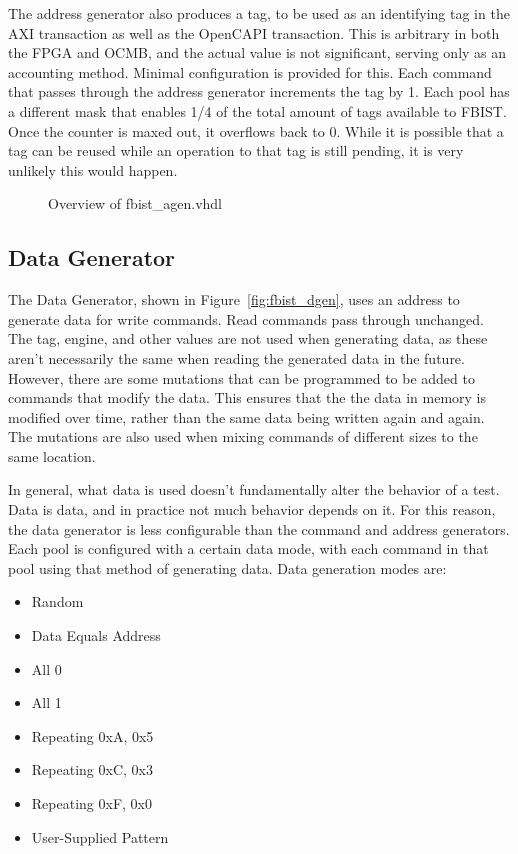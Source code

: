 The address generator also produces a tag, to be used as an
identifying tag in the AXI transaction as well as the OpenCAPI
transaction. This is arbitrary in both the FPGA and OCMB, and the
actual value is not significant, serving only as an accounting
method. Minimal configuration is provided for this. Each command that
passes through the address generator increments the tag by 1. Each
pool has a different mask that enables 1/4 of the total amount of tags
available to FBIST. Once the counter is maxed out, it overflows back
to 0. While it is possible that a tag can be reused while an operation
to that tag is still pending, it is very unlikely this would happen.

\begin{figure}[h]
  \begin{center}
    
  \end{center}
  \caption[Overview of fbist\_agen.vhdl]{\label{fig:fbist_agen}Overview of fbist\_agen.vhdl
  }
\end{figure}

\subsection{Data Generator}
The Data Generator, shown in Figure~\ref{fig:fbist_dgen}, uses an
address to generate data for write commands. Read commands pass
through unchanged. The tag, engine, and other values are not used when
generating data, as these aren't necessarily the same when reading the
generated data in the future. However, there are some mutations that
can be programmed to be added to commands that modify the data. This
ensures that the the data in memory is modified over time, rather than
the same data being written again and again. The mutations are also
used when mixing commands of different sizes to the same location.

In general, what data is used doesn't fundamentally alter the behavior
of a test. Data is data, and in practice not much behavior depends on
it. For this reason, the data generator is less configurable than the
command and address generators. Each pool is configured with a certain
data mode, with each command in that pool using that method of
generating data. Data generation modes are:
\begin{itemize}
  \item Random
  \item Data Equals Address
  \item All 0
  \item All 1
  \item Repeating 0xA, 0x5
  \item Repeating 0xC, 0x3
  \item Repeating 0xF, 0x0
  \item User-Supplied Pattern
\end{itemize}

